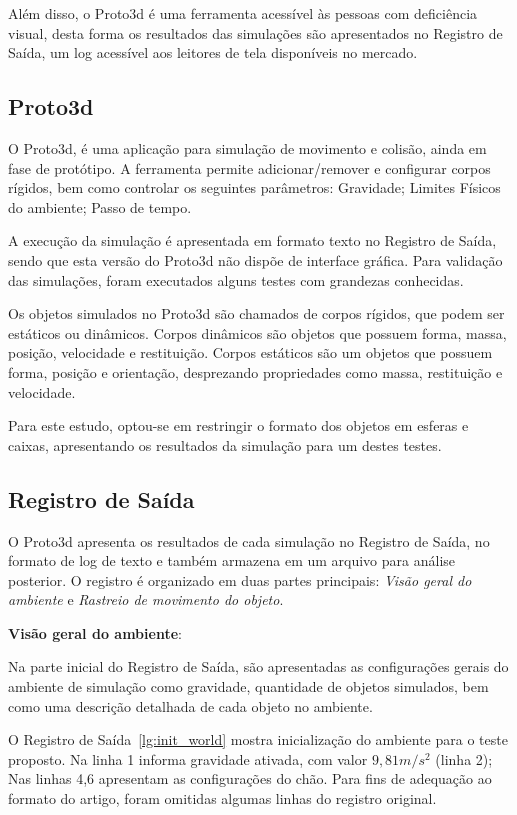 \documentclass[12pt]{article}
\begin{document}
Além disso, o Proto3d é uma ferramenta acessível às pessoas com deficiência visual, desta forma os resultados das simulações são apresentados no Registro de Saída, um log acessível aos leitores de tela disponíveis no mercado.

\subsection {Proto3d}
O Proto3d, é uma aplicação para simulação de movimento e colisão, ainda em fase de protótipo. A ferramenta permite adicionar/remover e configurar corpos rígidos, bem como controlar os seguintes parâmetros: Gravidade; Limites Físicos do ambiente; Passo de tempo. 

A execução da simulação é apresentada em formato texto no Registro de Saída, sendo que esta versão do Proto3d não dispõe de interface gráfica. Para validação das simulações, foram executados alguns testes com grandezas conhecidas. 

Os objetos simulados no Proto3d são chamados de corpos rígidos, que podem ser estáticos ou dinâmicos. Corpos dinâmicos são objetos que possuem forma, massa, posição, velocidade e restituição. Corpos estáticos são um objetos que possuem forma, posição e orientação, desprezando propriedades como massa, restituição e velocidade. 

Para este estudo, optou-se em restringir o formato dos objetos em esferas e caixas, apresentando os resultados da simulação para um destes testes.


\subsection{Registro de Saída}
O Proto3d apresenta os resultados de cada simulação no Registro de Saída, no formato de log de texto e também armazena em um arquivo para análise posterior. O registro é organizado em duas partes principais: \emph{Visão geral do ambiente} e \emph{Rastreio de movimento do objeto}.

\noindent\textbf{Visão geral do ambiente}:  

Na parte inicial do Registro de Saída, são apresentadas as configurações gerais do ambiente de simulação como gravidade, quantidade de objetos simulados, bem como uma descrição detalhada de cada objeto no ambiente. 

O Registro de Saída~\ref{lg:init_world} mostra inicialização do ambiente para o teste proposto. Na linha 1 informa gravidade ativada, com valor $ 9,81 m/s^{2} $ (linha 2); Nas linhas 4,6 apresentam as configurações do chão. Para fins de adequação ao formato do artigo, foram omitidas algumas linhas do registro original. 
\end{document}
